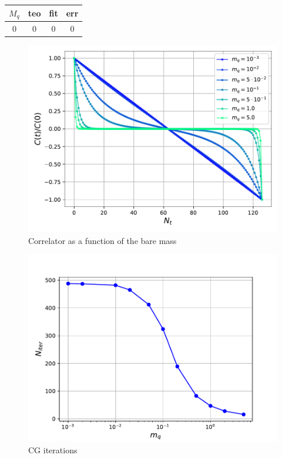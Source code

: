 \begin{table}
    \centering
    \begin{tabular}[pos]{cccc}
        \toprule 
        $M_q$ & teo & fit & err \\
        \midrule 
        0 & 0 & 0 & 0 \\
        \bottomrule
    \end{tabular}
\end{table}
\begin{figure}
    \centering 
    \includegraphics[scale=0.6]{figures/correlator/correlator.pdf}
    \caption{Correlator as a function of the bare mass}
    \label{fig:correlator_mass}
\end{figure}

\begin{figure}
    \centering 
    \includegraphics[scale=0.6]{figures/correlator/CGiter.pdf}
    \caption{CG iterations}
    \label{fig:correlator_CGiter}
\end{figure}

